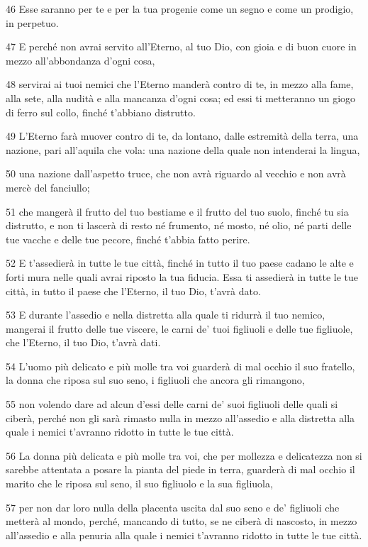 \par 46 Esse saranno per te e per la tua progenie come un segno e come un prodigio, in perpetuo.
\par 47 E perché non avrai servito all'Eterno, al tuo Dio, con gioia e di buon cuore in mezzo all'abbondanza d'ogni cosa,
\par 48 servirai ai tuoi nemici che l'Eterno manderà contro di te, in mezzo alla fame, alla sete, alla nudità e alla mancanza d'ogni cosa; ed essi ti metteranno un giogo di ferro sul collo, finché t'abbiano distrutto.
\par 49 L'Eterno farà muover contro di te, da lontano, dalle estremità della terra, una nazione, pari all'aquila che vola: una nazione della quale non intenderai la lingua,
\par 50 una nazione dall'aspetto truce, che non avrà riguardo al vecchio e non avrà mercè del fanciullo;
\par 51 che mangerà il frutto del tuo bestiame e il frutto del tuo suolo, finché tu sia distrutto, e non ti lascerà di resto né frumento, né mosto, né olio, né parti delle tue vacche e delle tue pecore, finché t'abbia fatto perire.
\par 52 E t'assedierà in tutte le tue città, finché in tutto il tuo paese cadano le alte e forti mura nelle quali avrai riposto la tua fiducia. Essa ti assedierà in tutte le tue città, in tutto il paese che l'Eterno, il tuo Dio, t'avrà dato.
\par 53 E durante l'assedio e nella distretta alla quale ti ridurrà il tuo nemico, mangerai il frutto delle tue viscere, le carni de' tuoi figliuoli e delle tue figliuole, che l'Eterno, il tuo Dio, t'avrà dati.
\par 54 L'uomo più delicato e più molle tra voi guarderà di mal occhio il suo fratello, la donna che riposa sul suo seno, i figliuoli che ancora gli rimangono,
\par 55 non volendo dare ad alcun d'essi delle carni de' suoi figliuoli delle quali si ciberà, perché non gli sarà rimasto nulla in mezzo all'assedio e alla distretta alla quale i nemici t'avranno ridotto in tutte le tue città.
\par 56 La donna più delicata e più molle tra voi, che per mollezza e delicatezza non si sarebbe attentata a posare la pianta del piede in terra, guarderà di mal occhio il marito che le riposa sul seno, il suo figliuolo e la sua figliuola,
\par 57 per non dar loro nulla della placenta uscita dal suo seno e de' figliuoli che metterà al mondo, perché, mancando di tutto, se ne ciberà di nascosto, in mezzo all'assedio e alla penuria alla quale i nemici t'avranno ridotto in tutte le tue città.
